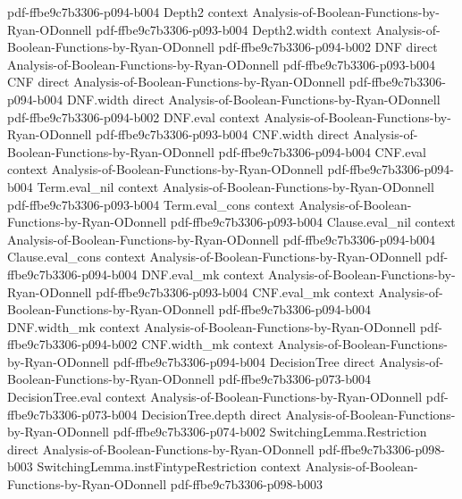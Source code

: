 \begin{theorem}
  {pdf-ffbe9c7b3306-p094-b004}
\proofstep
  {Depth2}
  {context}
  {Analysis-of-Boolean-Functions-by-Ryan-ODonnell}
  {pdf-ffbe9c7b3306-p093-b004}
\proofstep
  {Depth2.width}
  {context}
  {Analysis-of-Boolean-Functions-by-Ryan-ODonnell}
  {pdf-ffbe9c7b3306-p094-b002}
\proofstep
  {DNF}
  {direct}
  {Analysis-of-Boolean-Functions-by-Ryan-ODonnell}
  {pdf-ffbe9c7b3306-p093-b004}
\proofstep
  {CNF}
  {direct}
  {Analysis-of-Boolean-Functions-by-Ryan-ODonnell}
  {pdf-ffbe9c7b3306-p094-b004}
\proofstep
  {DNF.width}
  {direct}
  {Analysis-of-Boolean-Functions-by-Ryan-ODonnell}
  {pdf-ffbe9c7b3306-p094-b002}
\proofstep
  {DNF.eval}
  {context}
  {Analysis-of-Boolean-Functions-by-Ryan-ODonnell}
  {pdf-ffbe9c7b3306-p093-b004}
\proofstep
  {CNF.width}
  {direct}
  {Analysis-of-Boolean-Functions-by-Ryan-ODonnell}
  {pdf-ffbe9c7b3306-p094-b004}
\proofstep
  {CNF.eval}
  {context}
  {Analysis-of-Boolean-Functions-by-Ryan-ODonnell}
  {pdf-ffbe9c7b3306-p094-b004}
\proofstep
  {Term.eval_nil}
  {context}
  {Analysis-of-Boolean-Functions-by-Ryan-ODonnell}
  {pdf-ffbe9c7b3306-p093-b004}
\proofstep
  {Term.eval_cons}
  {context}
  {Analysis-of-Boolean-Functions-by-Ryan-ODonnell}
  {pdf-ffbe9c7b3306-p093-b004}
\proofstep
  {Clause.eval_nil}
  {context}
  {Analysis-of-Boolean-Functions-by-Ryan-ODonnell}
  {pdf-ffbe9c7b3306-p094-b004}
\proofstep
  {Clause.eval_cons}
  {context}
  {Analysis-of-Boolean-Functions-by-Ryan-ODonnell}
  {pdf-ffbe9c7b3306-p094-b004}
\proofstep
  {DNF.eval_mk}
  {context}
  {Analysis-of-Boolean-Functions-by-Ryan-ODonnell}
  {pdf-ffbe9c7b3306-p093-b004}
\proofstep
  {CNF.eval_mk}
  {context}
  {Analysis-of-Boolean-Functions-by-Ryan-ODonnell}
  {pdf-ffbe9c7b3306-p094-b004}
\proofstep
  {DNF.width_mk}
  {context}
  {Analysis-of-Boolean-Functions-by-Ryan-ODonnell}
  {pdf-ffbe9c7b3306-p094-b002}
\proofstep
  {CNF.width_mk}
  {context}
  {Analysis-of-Boolean-Functions-by-Ryan-ODonnell}
  {pdf-ffbe9c7b3306-p094-b004}
\proofstep
  {DecisionTree}
  {direct}
  {Analysis-of-Boolean-Functions-by-Ryan-ODonnell}
  {pdf-ffbe9c7b3306-p073-b004}
\proofstep
  {DecisionTree.eval}
  {context}
  {Analysis-of-Boolean-Functions-by-Ryan-ODonnell}
  {pdf-ffbe9c7b3306-p073-b004}
\proofstep
  {DecisionTree.depth}
  {direct}
  {Analysis-of-Boolean-Functions-by-Ryan-ODonnell}
  {pdf-ffbe9c7b3306-p074-b002}
\proofstep
  {SwitchingLemma.Restriction}
  {direct}
  {Analysis-of-Boolean-Functions-by-Ryan-ODonnell}
  {pdf-ffbe9c7b3306-p098-b003}
\proofstep
  {SwitchingLemma.instFintypeRestriction}
  {context}
  {Analysis-of-Boolean-Functions-by-Ryan-ODonnell}
  {pdf-ffbe9c7b3306-p098-b003}

\end{theorem}
